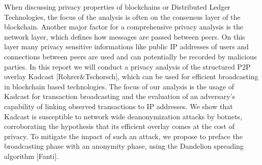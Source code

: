 When discussing privacy properties of blockchains or Distributed Ledger Technologies, the
focus of the analysis is often on the consensus layer of the blockchain.
Another major factor for a comprehensive privacy analysis is
the network layer, which defines how messages are passed between peers.
On this layer many privacy sensitive informations like public IP addresses of users and connections between peers
are used and can potentially be recorded by malicious parties.
In this report we will conduct a privacy analysis of the structured P2P overlay Kadcast [Rohrer\&Tschorsch],
which can be used for efficient broadcasting in blockchain based technologies.
The focus of our analysis is the usage of Kadcast for transaction broadcasting and the evaluation of an adversary's capability
of linking observed transactions to IP addresses.
We show that Kadcast is susceptible to network wide deanonymization attacks by botnets, corroborating the hypothesis that its
efficient overlay comes at the cost of privacy.
To mitigate the impact of such an attack, we propose to preface the broadcasting phase with an anonymity phase, using
the Dandelion spreading algorithm [Fanti].